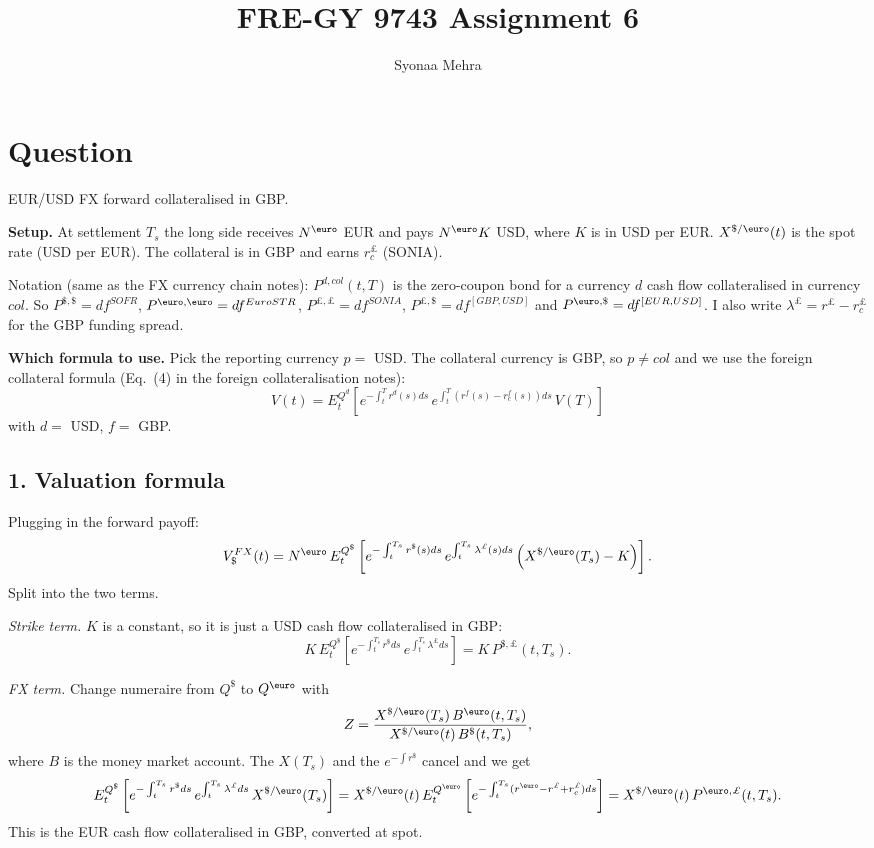 \documentclass[11pt]{article}
\title{FRE-GY 9743 Assignment 6}
\author{Syonaa Mehra}
\date{}
\begin{document}
\maketitle

\section*{Question}

EUR/USD FX forward collateralised in GBP.

\textbf{Setup.} At settlement $T_s$ the long side receives $N^{\text{\euro}}$ EUR and pays
$N^{\text{\euro}} K$ USD, where $K$ is in USD per EUR. $X^{\$/\text{\euro}}(t)$ is the spot
rate (USD per EUR). The collateral is in GBP and earns $r_c^{\pounds}$ (SONIA).

Notation (same as the FX currency chain notes): $P^{d,col}(t,T)$ is the zero-coupon bond for a
currency $d$ cash flow collateralised in currency $col$. So $P^{\$,\$} = df^{SOFR}$,
$P^{\text{\euro},\text{\euro}} = df^{EuroSTR}$, $P^{\pounds,\pounds} = df^{SONIA}$,
$P^{\pounds,\$} = df^{[GBP,USD]}$ and $P^{\text{\euro},\$} = df^{[EUR,USD]}$.
I also write $\lambda^{\pounds} = r^{\pounds} - r^{\pounds}_c$ for the GBP funding spread.

\textbf{Which formula to use.} Pick the reporting currency $p = $ USD. The collateral currency
is GBP, so $p \neq col$ and we use the foreign collateral formula
(Eq.\ (4) in the foreign collateralisation notes):
\[
V(t) = E^{Q^d}_t\left[ e^{-\int_t^T r^d(s)ds}\, e^{\int_t^T (r^f(s) - r^f_c(s))ds}\, V(T) \right]
\]
with $d = $ USD, $f = $ GBP.

\subsection*{1. Valuation formula}

Plugging in the forward payoff:
\[
V_{\$}^{FX}(t) = N^{\text{\euro}}\, E^{Q^\$}_t\left[ e^{-\int_t^{T_s} r^\$(s)ds}\,
e^{\int_t^{T_s} \lambda^{\pounds}(s)ds} \left( X^{\$/\text{\euro}}(T_s) - K \right) \right].
\]
Split into the two terms.

\emph{Strike term.} $K$ is a constant, so it is just a USD cash flow collateralised in GBP:
\[
K\, E^{Q^\$}_t\left[ e^{-\int_t^{T_s} r^\$ ds}\, e^{\int_t^{T_s} \lambda^{\pounds} ds} \right]
= K\, P^{\$,\pounds}(t,T_s).
\]

\emph{FX term.} Change numeraire from $Q^\$$ to $Q^{\text{\euro}}$ with
\[
Z = \frac{X^{\$/\text{\euro}}(T_s)\, B^{\text{\euro}}(t,T_s)}{X^{\$/\text{\euro}}(t)\, B^{\$}(t,T_s)},
\]
where $B$ is the money market account. The $X(T_s)$ and the $e^{-\int r^\$}$ cancel and we get
\[
E^{Q^\$}_t\left[ e^{-\int_t^{T_s} r^\$ ds}\, e^{\int_t^{T_s} \lambda^{\pounds} ds}\, X^{\$/\text{\euro}}(T_s) \right]
= X^{\$/\text{\euro}}(t)\, E^{Q^{\text{\euro}}}_t\left[ e^{-\int_t^{T_s} (r^{\text{\euro}} - r^{\pounds} + r^{\pounds}_c) ds} \right]
= X^{\$/\text{\euro}}(t)\, P^{\text{\euro},\pounds}(t,T_s).
\]
This is the EUR cash flow collateralised in GBP, converted at spot.
\end{document}
